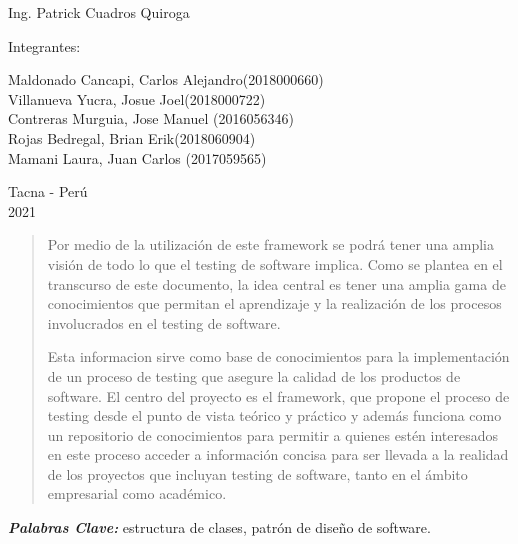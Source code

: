 \documentclass[12pt,letterpaper]{article}
\providecommand{\pclave}[1]
{
  \small	
  \textbf{\textit{Palabras Clave:}} #1
}
\begin{document}
\begin{titlepage}
\begin{center}
\vspace*{0.1in}
\begin{large}
 Ing. Patrick Cuadros Quiroga\\
\end{large}

\vspace*{0.2in}
\vspace*{0.1in}
\begin{large}
Integrantes:\\
\begin{flushleft}
Maldonado Cancapi, Carlos Alejandro\hfill(2018000660) \\
Villanueva Yucra, Josue Joel\hfill(2018000722)\\
Contreras Murguia, Jose Manuel \hfill(2016056346)\\
Rojas Bedregal, Brian Erik\hfill(2018060904)\\
Mamani Laura, Juan Carlos \hfill(2017059565)\\

\end{flushleft}
\end{large}

\vspace*{0.1in}
\begin{large}
Tacna - Perú\\
2021\\

\end{large}
\end{center}

\end{titlepage}

\begin{abstract}
    Por medio de la utilización de este framework se podrá tener una amplia visión de todo lo que el testing de software implica. Como se plantea en el transcurso de este documento, la idea central es tener una amplia gama de conocimientos que permitan el aprendizaje y la realización de los procesos involucrados en el testing de software.

    Esta informacion sirve como base de conocimientos para la implementación de un proceso de testing que asegure la calidad de los productos de software. El centro del proyecto es el framework, que propone el proceso de testing desde el punto de vista teórico y práctico y además funciona como un repositorio de conocimientos para permitir a quienes estén interesados en este proceso acceder a información concisa para ser llevada a la realidad de los proyectos que incluyan testing de software, tanto en el ámbito empresarial como académico.

\end{abstract}
\pclave{estructura de clases, patrón de diseño de software.}
\end{document}
